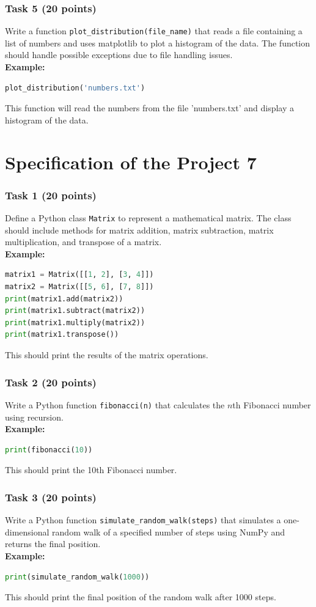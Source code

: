 \documentclass[12pt]{book}
\begin{document}
\subsubsection{Task 5 (20 points)}
Write a function \texttt{plot\_distribution(file\_name)} that reads a file containing a list of numbers and uses matplotlib to plot a histogram of the data. The function should handle possible exceptions due to file handling issues. \\
\textbf{Example:}
\begin{lstlisting}[language=Python]
plot_distribution('numbers.txt')
\end{lstlisting}
This function will read the numbers from the file 'numbers.txt' and display a histogram of the data.

\section{Specification of the Project 7}
\subsubsection{Task 1 (20 points)}
Define a Python class \texttt{Matrix} to represent a mathematical matrix. The class should include methods for matrix addition, matrix subtraction, matrix multiplication, and transpose of a matrix. \\
\textbf{Example:}
\begin{lstlisting}[language=Python]
matrix1 = Matrix([[1, 2], [3, 4]])
matrix2 = Matrix([[5, 6], [7, 8]])
print(matrix1.add(matrix2))
print(matrix1.subtract(matrix2))
print(matrix1.multiply(matrix2))
print(matrix1.transpose())
\end{lstlisting}
This should print the results of the matrix operations.

\subsubsection{Task 2 (20 points)}
Write a Python function \texttt{fibonacci(n)} that calculates the $n$th Fibonacci number using recursion. \\
\textbf{Example:}
\begin{lstlisting}[language=Python]
print(fibonacci(10))
\end{lstlisting}
This should print the 10th Fibonacci number.

\subsubsection{Task 3 (20 points)}
Write a Python function \texttt{simulate\_random\_walk(steps)} that simulates a one-dimensional random walk of a specified number of steps using NumPy and returns the final position. \\
\textbf{Example:}
\begin{lstlisting}[language=Python]
print(simulate_random_walk(1000))
\end{lstlisting}
This should print the final position of the random walk after 1000 steps.
\end{document}
